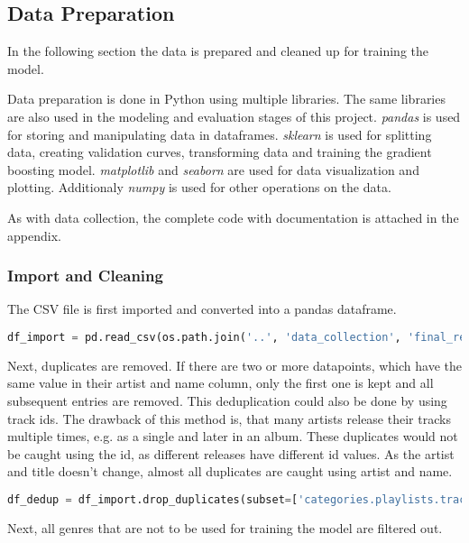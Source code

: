 \subsection{Data Preparation}
\label{sec:Data Preparation}

In the following section the data is prepared and cleaned up for training the model.

Data preparation is done in Python using multiple libraries. The same libraries
are also used in the modeling and evaluation stages of this project.
\emph{pandas} is used for storing and manipulating data in dataframes.
\emph{sklearn} is used for splitting data, creating validation curves,
transforming data and training the gradient boosting model.
\emph{matplotlib} and \emph{seaborn} are used for data visualization and plotting.
Additionaly \emph{numpy} is used for other operations on the data.

As with data collection, the complete code with documentation is attached in the appendix.

\subsubsection{Import and Cleaning}


The CSV file is first imported and converted into a pandas dataframe.

\begin{lstlisting}[language=Python]
    df_import = pd.read_csv(os.path.join('..', 'data_collection', 'final_result.csv'))
\end{lstlisting}

Next, duplicates are removed. If there are two or more datapoints, which have the same value in their artist
and name column, only the first one is kept and all subsequent entries are removed.
This deduplication could also be done by using track ids. The drawback of this method is, that many artists
release their tracks multiple times, e.g. as a single and later in an album. These duplicates would not be
caught using the id, as different releases have different id values. As the artist and title doesn't change, almost
all duplicates are caught using artist and name.

\begin{lstlisting}[language=Python]
    df_dedup = df_import.drop_duplicates(subset=['categories.playlists.tracks.artists', 'categories.playlists.tracks.name'])
\end{lstlisting}

Next, all genres that are not to be used for training the model are filtered out.

